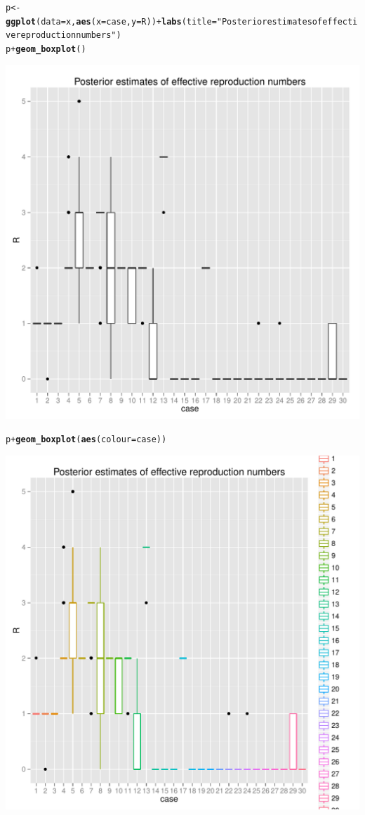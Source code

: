 \documentclass{article}\usepackage[]{graphicx}\usepackage[]{color}
\makeatletter
\newcommand{\hlstr}[1]{\textcolor[rgb]{0.192,0.494,0.8}{#1}}%
\newcommand{\hlopt}[1]{\textcolor[rgb]{0,0,0}{#1}}%
\newcommand{\hlstd}[1]{\textcolor[rgb]{0.345,0.345,0.345}{#1}}%
\newcommand{\hlkwb}[1]{\textcolor[rgb]{0.69,0.353,0.396}{#1}}%
\newcommand{\hlkwc}[1]{\textcolor[rgb]{0.333,0.667,0.333}{#1}}%
\newcommand{\hlkwd}[1]{\textcolor[rgb]{0.737,0.353,0.396}{\textbf{#1}}}%
\newenvironment{kframe}{%
 \def\at@end@of@kframe{}%
 \ifinner\ifhmode%
  \def\at@end@of@kframe{\end{minipage}}%
  \begin{minipage}{\columnwidth}%
 \fi\fi%
 \def\FrameCommand##1{\hskip\@totalleftmargin \hskip-\fboxsep
 \colorbox{shadecolor}{##1}\hskip-\fboxsep
     \hskip-\linewidth \hskip-\@totalleftmargin \hskip\columnwidth}%
 \MakeFramed {\advance\hsize-\width
   \@totalleftmargin\z@ \linewidth\hsize
   \@setminipage}}%
 {\par\unskip\endMakeFramed%
 \at@end@of@kframe}
\newenvironment{knitrout}{}{} %
\makeatother
\begin{document}
\begin{knitrout}
\color{fgcolor}\begin{kframe}
\begin{alltt}
\hlstd{p} \hlkwb{<-} \hlkwd{ggplot}\hlstd{(}\hlkwc{data}\hlstd{=x,} \hlkwd{aes}\hlstd{(}\hlkwc{x}\hlstd{=case,} \hlkwc{y}\hlstd{=R))} \hlopt{+} \hlkwd{labs}\hlstd{(}\hlkwc{title}\hlstd{=}\hlstr{"Posterior estimates of effective reproduction numbers"}\hlstd{)}
\hlstd{p} \hlopt{+} \hlkwd{geom_boxplot}\hlstd{()}
\end{alltt}
\end{kframe}

{\centering \includegraphics[width=.6\textwidth]{figs/unnamed-chunk-501} 

}


\begin{kframe}\begin{alltt}
\hlstd{p} \hlopt{+} \hlkwd{geom_boxplot}\hlstd{(}\hlkwd{aes}\hlstd{(}\hlkwc{colour}\hlstd{=case))}
\end{alltt}
\end{kframe}

{\centering \includegraphics[width=.6\textwidth]{figs/unnamed-chunk-502} 

}



\end{knitrout}
\end{document}

